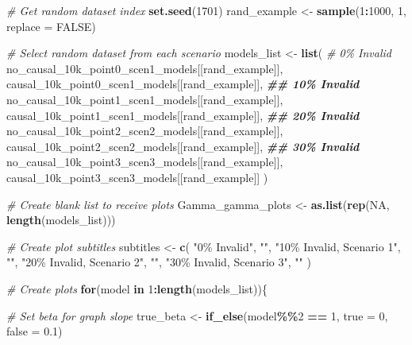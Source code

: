\documentclass[
]{article}
\newenvironment{Shaded}{\begin{snugshade}}{\end{snugshade}}
\newcommand{\AttributeTok}[1]{\textcolor[rgb]{0.13,0.29,0.53}{#1}}
\newcommand{\CommentTok}[1]{\textcolor[rgb]{0.56,0.35,0.01}{\textit{#1}}}
\newcommand{\ConstantTok}[1]{\textcolor[rgb]{0.56,0.35,0.01}{#1}}
\newcommand{\ControlFlowTok}[1]{\textcolor[rgb]{0.13,0.29,0.53}{\textbf{#1}}}
\newcommand{\DecValTok}[1]{\textcolor[rgb]{0.00,0.00,0.81}{#1}}
\newcommand{\DocumentationTok}[1]{\textcolor[rgb]{0.56,0.35,0.01}{\textbf{\textit{#1}}}}
\newcommand{\FloatTok}[1]{\textcolor[rgb]{0.00,0.00,0.81}{#1}}
\newcommand{\FunctionTok}[1]{\textcolor[rgb]{0.13,0.29,0.53}{\textbf{#1}}}
\newcommand{\NormalTok}[1]{#1}
\newcommand{\OtherTok}[1]{\textcolor[rgb]{0.56,0.35,0.01}{#1}}
\newcommand{\SpecialCharTok}[1]{\textcolor[rgb]{0.81,0.36,0.00}{\textbf{#1}}}
\newcommand{\StringTok}[1]{\textcolor[rgb]{0.31,0.60,0.02}{#1}}
\begin{document}
\begin{Shaded}
\begin{Highlighting}[]
\CommentTok{\# Get random dataset index}
\FunctionTok{set.seed}\NormalTok{(}\DecValTok{1701}\NormalTok{)}
\NormalTok{rand\_example }\OtherTok{\textless{}{-}} \FunctionTok{sample}\NormalTok{(}\DecValTok{1}\SpecialCharTok{:}\DecValTok{1000}\NormalTok{, }\DecValTok{1}\NormalTok{, }\AttributeTok{replace =} \ConstantTok{FALSE}\NormalTok{)}

\CommentTok{\# Select random dataset from each scenario}
\NormalTok{models\_list }\OtherTok{\textless{}{-}} \FunctionTok{list}\NormalTok{(}
  \CommentTok{\# 0\% Invalid}
\NormalTok{  no\_causal\_10k\_point0\_scen1\_models[[rand\_example]],}
\NormalTok{  causal\_10k\_point0\_scen1\_models[[rand\_example]],}
  \DocumentationTok{\#\# 10\% Invalid}
\NormalTok{  no\_causal\_10k\_point1\_scen1\_models[[rand\_example]],}
\NormalTok{  causal\_10k\_point1\_scen1\_models[[rand\_example]],}
  \DocumentationTok{\#\# 20\% Invalid}
\NormalTok{  no\_causal\_10k\_point2\_scen2\_models[[rand\_example]],}
\NormalTok{  causal\_10k\_point2\_scen2\_models[[rand\_example]],}
  \DocumentationTok{\#\# 30\% Invalid}
\NormalTok{  no\_causal\_10k\_point3\_scen3\_models[[rand\_example]],}
\NormalTok{  causal\_10k\_point3\_scen3\_models[[rand\_example]]}
\NormalTok{)}

\CommentTok{\# Create blank list to receive plots}
\NormalTok{Gamma\_gamma\_plots }\OtherTok{\textless{}{-}} \FunctionTok{as.list}\NormalTok{(}\FunctionTok{rep}\NormalTok{(}\ConstantTok{NA}\NormalTok{, }\FunctionTok{length}\NormalTok{(models\_list)))}

\CommentTok{\# Create plot subtitles}
\NormalTok{subtitles }\OtherTok{\textless{}{-}} \FunctionTok{c}\NormalTok{(}
  \StringTok{"0\% Invalid"}\NormalTok{,}
  \StringTok{""}\NormalTok{,}
  \StringTok{"10\% Invalid, Scenario 1"}\NormalTok{,}
  \StringTok{""}\NormalTok{,}
  \StringTok{"20\% Invalid, Scenario 2"}\NormalTok{,}
  \StringTok{""}\NormalTok{,}
  \StringTok{"30\% Invalid, Scenario 3"}\NormalTok{,}
  \StringTok{""}
\NormalTok{)}


\CommentTok{\# Create plots}
\ControlFlowTok{for}\NormalTok{(model }\ControlFlowTok{in} \DecValTok{1}\SpecialCharTok{:}\FunctionTok{length}\NormalTok{(models\_list))\{}
  
  \CommentTok{\# Set beta for graph slope}
\NormalTok{  true\_beta }\OtherTok{\textless{}{-}} \FunctionTok{if\_else}\NormalTok{(model}\SpecialCharTok{\%\%}\DecValTok{2} \SpecialCharTok{==} \DecValTok{1}\NormalTok{,}
                       \AttributeTok{true =} \DecValTok{0}\NormalTok{,}
                       \AttributeTok{false =} \FloatTok{0.1}\NormalTok{) }
  

\end{Highlighting}
\end{Shaded}
\end{document}

